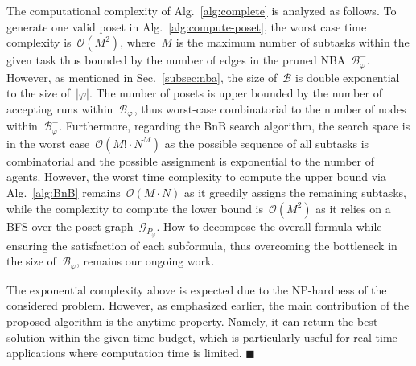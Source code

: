 The computational complexity of Alg.~\ref{alg:complete}
is analyzed as follows. To generate one valid poset in Alg.~\ref{alg:compute-poset},
the worst case time complexity is~$\mathcal{O}(M^2)$, where~$M$ is the maximum
number of subtasks within the given task thus bounded by the number of edges in the
pruned NBA~$\mathcal{B}^-_{\varphi}$.
However, as mentioned in Sec.~\ref{subsec:nba},
the size of~$\mathcal{B}$ is double exponential to the size of~$|\varphi|$.
The number of posets is upper bounded by the number of accepting runs
within~$\mathcal{B}^-_{\varphi}$, thus worst-case combinatorial to
the number of nodes within~$\mathcal{B}^-_{\varphi}$.
Furthermore, regarding the BnB search algorithm, the search space is in the worst
case~$\mathcal{O}(M!\cdot N^M)$ as the possible sequence of all subtasks
is combinatorial and the possible assignment is exponential to the
number of agents.
However, the worst time complexity to compute the upper bound via Alg.~\ref{alg:BnB}
remains~$\mathcal{O}(M\cdot N)$ as it greedily assigns the remaining subtasks,
while the complexity to compute the lower bound is~$\mathcal{O}(M^2)$ as it relies on a BFS over
the poset graph~$\mathcal{G}_{P_\varphi}$.
How to decompose the overall formula while ensuring
the satisfaction of each subformula, thus overcoming the bottleneck
in the size of~$\mathcal{B}_{\varphi}$, remains our ongoing work.

\begin{remark}\label{remark:anytime}
The exponential complexity above is expected due to the NP-hardness of the considered problem.
However, as emphasized earlier, the main contribution of the proposed algorithm
is the anytime property.
Namely, it can return the best solution within the given time budget,
which is particularly useful for real-time applications where computation time is limited.
\hfill  $\blacksquare$
\end{remark}
